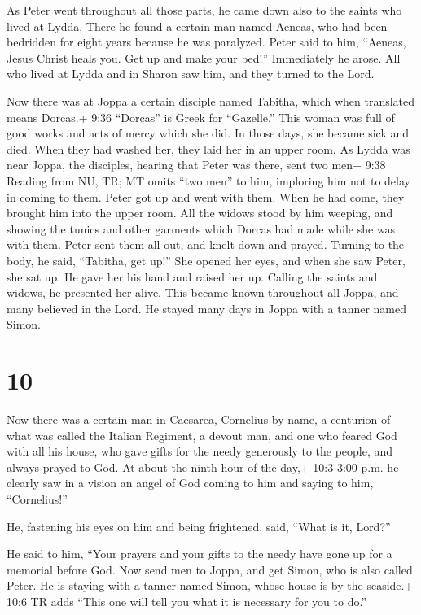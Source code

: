  As Peter went throughout all those parts, he came down
also to the saints who lived at Lydda.  There he found a
certain man named Aeneas, who had been bedridden for eight years because
he was paralyzed.  Peter said to him, ``Aeneas, Jesus
Christ heals you. Get up and make your bed!'' Immediately he arose.
 All who lived at Lydda and in Sharon saw him, and they
turned to the Lord.

 Now there was at Joppa a certain disciple named Tabitha,
which when translated means Dorcas.+ 9:36 ``Dorcas'' is Greek for
``Gazelle.'' This woman was full of good works and acts of mercy which
she did.  In those days, she became sick and died. When
they had washed her, they laid her in an upper room.  As
Lydda was near Joppa, the disciples, hearing that Peter was there, sent
two men+ 9:38 Reading from NU, TR; MT omits ``two men'' to him,
imploring him not to delay in coming to them.  Peter got up
and went with them. When he had come, they brought him into the upper
room. All the widows stood by him weeping, and showing the tunics and
other garments which Dorcas had made while she was with them.
 Peter sent them all out, and knelt down and prayed.
Turning to the body, he said, ``Tabitha, get up!'' She opened her eyes,
and when she saw Peter, she sat up.  He gave her his hand
and raised her up. Calling the saints and widows, he presented her
alive.  This became known throughout all Joppa, and many
believed in the Lord.  He stayed many days in Joppa with a
tanner named Simon.

\hypertarget{section-9}{%
\section{10}\label{section-9}}

 Now there was a certain man in Caesarea, Cornelius by name,
a centurion of what was called the Italian Regiment,  a
devout man, and one who feared God with all his house, who gave gifts
for the needy generously to the people, and always prayed to God.
 At about the ninth hour of the day,+ 10:3 3:00 p.m. he
clearly saw in a vision an angel of God coming to him and saying to him,
``Cornelius!''

 He, fastening his eyes on him and being frightened, said,
``What is it, Lord?''

He said to him, ``Your prayers and your gifts to the needy have gone up
for a memorial before God.  Now send men to Joppa, and get
Simon, who is also called Peter.  He is staying with a
tanner named Simon, whose house is by the seaside.+ 10:6 TR adds ``This
one will tell you what it is necessary for you to do.''


